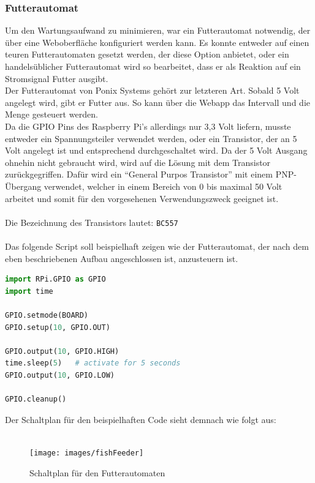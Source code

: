 \newpage
\subsubsection{Futterautomat}
Um den Wartungsaufwand zu minimieren, war ein Futterautomat notwendig, der \"uber eine Weboberfl\"ache konfiguriert werden kann. Es konnte entweder auf einen teuren Futterautomaten gesetzt werden, der diese Option anbietet, oder ein handelsüblicher Futterautomat wird so bearbeitet, dass er als Reaktion auf ein Stromsignal Futter ausgibt. \\
Der Futterautomat von Ponix Systems geh\"ort zur letzteren Art. Sobald 5 Volt angelegt wird, gibt er Futter aus. So kann \"uber die Webapp das Intervall und die Menge gesteuert werden. \\
Da die \gls{GPIO} Pins des Raspberry Pi's allerdings nur 3,3 Volt liefern, musste entweder ein Spannungsteiler verwendet werden, oder ein Transistor, der an 5 Volt angelegt ist und entsprechend durchgeschaltet wird. Da der 5 Volt Ausgang ohnehin nicht gebraucht wird, wird auf die Lösung mit dem Transistor zurückgegriffen. Dafür wird ein "`General Purpos Transistor"' mit einem PNP-Übergang verwendet, welcher in einem Bereich von 0 bis maximal 50 Volt arbeitet und somit für den vorgesehenen Verwendungszweck geeignet ist. \cite{BC557} \\ \mbox{} \\
Die Bezeichnung des Transistors lautet: \texttt{BC557}
\\ \mbox{} \\
Das folgende Script soll beispielhaft zeigen wie der Futterautomat, der nach dem eben beschriebenen Aufbau angeschlossen ist, anzusteuern ist.
\begin{lstlisting}[language=Python]
import RPi.GPIO as GPIO
import time

GPIO.setmode(BOARD)
GPIO.setup(10, GPIO.OUT)

GPIO.output(10, GPIO.HIGH)
time.sleep(5)   # activate for 5 seconds
GPIO.output(10, GPIO.LOW)

GPIO.cleanup()
\end{lstlisting}
\newpage
Der Schaltplan für den beispielhaften Code sieht demnach wie folgt aus: \\ \mbox{} \\
\begin{figure}[ht]
    \centering
    \texttt{[image: images/fishFeeder]}
    \caption{Schaltplan für den Futterautomaten}
\end{figure}
\newpage
